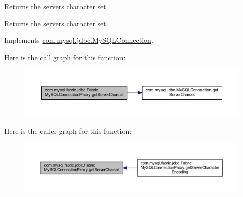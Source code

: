 Returns the server\textquotesingle{}s character set

\begin{DoxyReturn}{Returns}
the server\textquotesingle{}s character set. 
\end{DoxyReturn}


Implements \mbox{\hyperlink{interfacecom_1_1mysql_1_1jdbc_1_1_my_s_q_l_connection_a4f921d9cf354764fd1241cd56c0abecb}{com.\+mysql.\+jdbc.\+My\+S\+Q\+L\+Connection}}.

Here is the call graph for this function\+:\nopagebreak
\begin{figure}[H]
\begin{center}
\leavevmode
\includegraphics[width=350pt]{classcom_1_1mysql_1_1fabric_1_1jdbc_1_1_fabric_my_s_q_l_connection_proxy_a05da3e56f23e090e7a4048dcd59d1454_cgraph}
\end{center}
\end{figure}
Here is the caller graph for this function\+:\nopagebreak
\begin{figure}[H]
\begin{center}
\leavevmode
\includegraphics[width=350pt]{classcom_1_1mysql_1_1fabric_1_1jdbc_1_1_fabric_my_s_q_l_connection_proxy_a05da3e56f23e090e7a4048dcd59d1454_icgraph}
\end{center}
\end{figure}
\mbox{\label{classcom_1_1mysql_1_1fabric_1_1jdbc_1_1_fabric_my_s_q_l_connection_proxy_ae95ee3dba66db1708e523e8cec989ab5}} 
